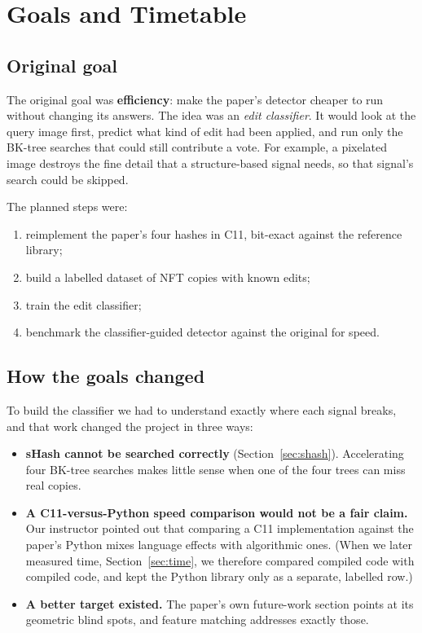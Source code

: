 \section{Goals and Timetable}
\label{sec:goals}

\subsection{Original goal}

The original goal was \textbf{efficiency}: make the paper's detector cheaper to run without
changing its answers. The idea was an \emph{edit classifier}. It would look at the query
image first, predict what kind of edit had been applied, and run only the BK-tree searches
that could still contribute a vote. For example, a pixelated image destroys the fine detail
that a structure-based signal needs, so that signal's search could be skipped.

The planned steps were:
\begin{enumerate}
  \item reimplement the paper's four hashes in C11, bit-exact against the reference library;
  \item build a labelled dataset of NFT copies with known edits;
  \item train the edit classifier;
  \item benchmark the classifier-guided detector against the original for speed.
\end{enumerate}

\subsection{How the goals changed}

To build the classifier we had to understand exactly where each signal breaks, and that
work changed the project in three ways:
\begin{itemize}
  \item \textbf{sHash cannot be searched correctly} (Section~\ref{sec:shash}). Accelerating
        four BK-tree searches makes little sense when one of the four trees can miss real copies.
  \item \textbf{A C11-versus-Python speed comparison would not be a fair claim.} Our
        instructor pointed out that comparing a C11 implementation against the paper's Python
        mixes language effects with algorithmic ones. (When we later measured time,
        Section~\ref{sec:time}, we therefore compared compiled code with compiled code, and kept
        the Python library only as a separate, labelled row.)
  \item \textbf{A better target existed.} The paper's own future-work section points at its
        geometric blind spots, and feature matching addresses exactly those.
\end{itemize}

